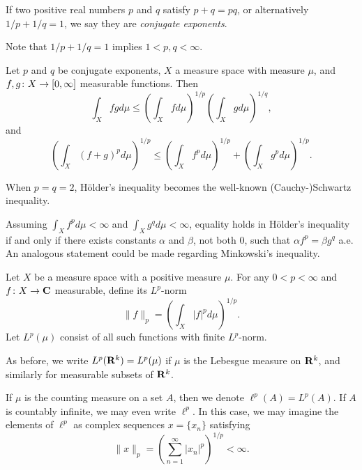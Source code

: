 \begin{definition}
  If two positive real numbers $p$ and $q$ satisfy $p + q = p q$, or alternatively $1/p + 1/q = 1$, we say they are \emph{conjugate exponents}.
\end{definition}

\begin{remark}
  Note that $1/p + 1/q = 1$ implies $1 < p,q < \infty$.
\end{remark}

\begin{theorem}
  Let $p$ and $q$ be conjugate exponents, $X$ a measure space with measure $\mu$, and $f,g \colon X \rightarrow [0,\infty]$ measurable functions. Then
  \[
  \tag{H\"older's inequality}
  \int_X f g d\mu \leq \left( \int_X f d\mu \right)^{1/p} \left( \int_X g d\mu \right)^{1/q},
  \]
  and
  \[
  \tag{Minkowski's inequality}
  \left( \int_X (f+g)^p d\mu \right)^{1/p} \leq \left( \int_X f^p d\mu \right)^{1/p} + \left( \int_X g^p d\mu \right)^{1/p}.
  \]
\end{theorem}

\begin{remark}
  When $p = q = 2$, H\"older's inequality becomes the well-known (Cauchy-)Schwartz inequality.
\end{remark}

\begin{remark}
  Assuming $\int_X f^p d\mu < \infty$ and $\int_X g^q d\mu < \infty$, equality holds in H\"older's inequality if and only if there exists constants $\alpha$ and $\beta$, not both $0$, such that $\alpha f^p = \beta g^q$ a.e. An analogous statement could be made regarding Minkowski's inequality.
\end{remark}

\begin{definition}
  Let $X$ be a measure space with a positive measure $\mu$. For any $0 < p < \infty$ and $f \colon X \rightarrow \mathbf{C}$ measurable, define its $L^p$-norm
  \[
  \|f\|_p = \left( \int_X |f|^p d\mu \right)^{1/p}.
  \]
  Let $L^p(\mu)$ consist of all such functions with finite $L^p$-norm.

  As before, we write $L^p(\mathbf{R}^k) = L^p(\mu)$ if $\mu$ is the Lebesgue measure on $\mathbf{R}^k$, and similarly for measurable subsets of $\mathbf{R}^k$.

  If $\mu$ is the counting measure on a set $A$, then we denote $\ell^p(A) = L^p(A)$. If $A$ is countably infinite, we may even write $\ell^p$. In this case, we may imagine the elements of $\ell^p$ as complex sequences $x = \{x_n\}$ satisfying
  \[
  \|x\|_p = \left( \sum_{n=1}^\infty |x_n|^p \right)^{1/p} < \infty.
  \]
\end{definition}

